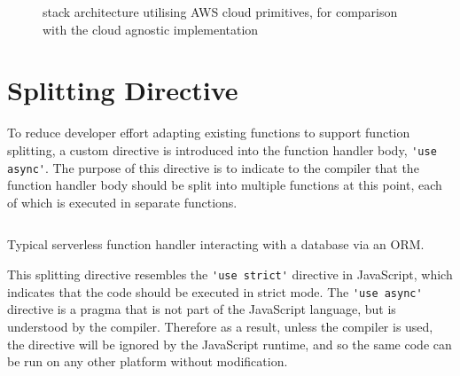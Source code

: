 \begin{figure*}
    \centering
    \caption{\faaas{} stack architecture utilising AWS cloud primitives, for comparison with the cloud agnostic \faaastime{} implementation}
    \label{fig:faaas-arch}
\end{figure*}

\section{Splitting Directive}
To reduce developer effort adapting existing functions to support function splitting, a custom directive is introduced into the function handler body, \verb|'use async'|. The purpose of this directive is to indicate to the \faaasc{} compiler that the function handler body should be split into multiple functions at this point, each of which is executed in separate \awslambda{} functions.

\begin{listing}[H]
  \inputminted{javascript}{node_modules/@faaas-bench/hello-seq/src/onHttpGetHello.trigger.ts}
  \caption{Typical serverless function handler interacting with a database via an ORM.}
\end{listing}

This splitting directive resembles the \verb|'use strict'| directive in JavaScript, which indicates that the code should be executed in strict mode. The \verb|'use async'| directive is a pragma that is not part of the JavaScript language, but is understood by the \faaasc{} compiler. Therefore as a result, unless the \faaasc{} compiler is used, the directive will be ignored by the JavaScript runtime, and so the same code can be run on any other \faas{} platform without modification.


